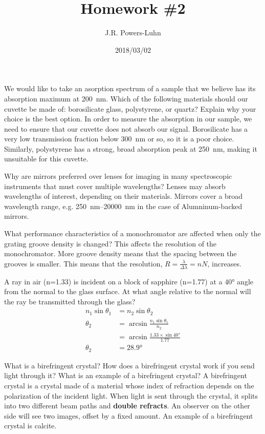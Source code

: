 \documentclass{hw}
\title{Homework \#2}
\author{J.R. Powers-Luhn}
\date{2018/03/02}
\begin{document}

\problem{}
    We would like to take an asorption spectrum of a sample that we believe has its absorption maximum at \SI{200}{\nano\meter}. Which of the following materials should our cuvette be made of: borosilicate glass, polystyrene, or quartz? Explain why your choice is the best option.
\solution
    In order to measure the absorption in our sample, we need to ensure that our cuvette does not absorb our signal. Borosilicate has a very low transmission fraction below \SI{300}{\nano\meter} or so, so it is a poor choice. Similarly, polystyrene has a strong, broad absorption peak at \SI{250}{\nano\meter}, making it unsuitable for this cuvette.

\problem{}
    Why are mirrors preferred over lenses for imaging in many spectroscopic instruments that must cover multiple wavelengths?
\solution
    Lenses may absorb wavelengths of interest, depending on their materials. Mirrors cover a broad wavelength range, e.g. \SIrange[scientific-notation = engineering]{250}{20000}{\nano\meter} in the case of Alumninum-backed mirrors.

\problem{}
    What performance characteristics of a monochromator are affected when only the grating groove density is changed?
\solution
    This affects the resolution of the monochromator. More groove density means that the spacing between the grooves is smaller. This means that the resolution, $R = \frac{\lambda}{\Delta \lambda} = n N$, increases.

\problem{}
    A ray in air (n=\num{1.33}) is incident on a block of sapphire (n=\num{1.77}) at a \ang{40} angle from the normal to the glass surface. At what angle relative to the normal will the ray be transmitted through the glass?
\solution
    \begin{align*}
        n_1 \sin \theta_1 &= n_2 \sin \theta_2 \\
        \theta_2 &= \arcsin \frac{n_1 \sin \theta_1}{n_2} \\
        &= \arcsin \frac{\num{1.33} \times \sin \ang{40}}{\num{1.77}} \\
        \theta_2 &= \ang{28.9}
    \end{align*}

\problem{}
    What is a birefringent crystal? How does a birefringent crystal work if you send light through it? What is an example of a birefringent crystal?
\solution
    A birefringent crystal is a crystal made of a material whose index of refraction depends on the polarization of the incident light. When light is sent through the crystal, it splits into two different beam paths and \textbf{double refracts}. An observer on the other side will see two images, offset by a fixed amount. An example of a birefringent crystal is calcite.
\end{document}
